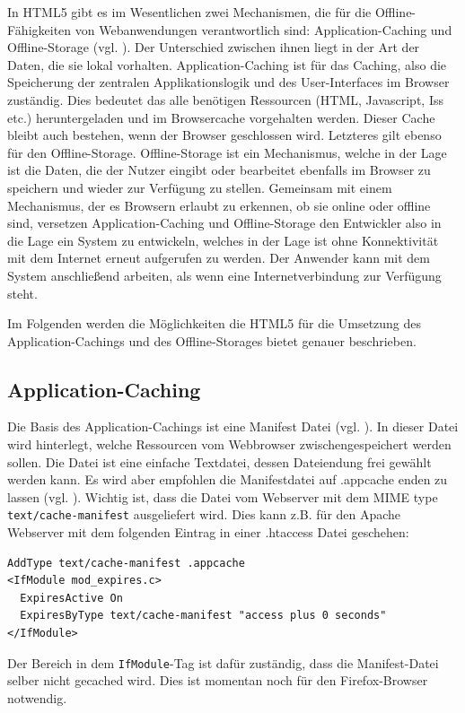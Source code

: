 In HTML5 gibt es im Wesentlichen zwei Mechanismen, die für die Offline-Fähigkeiten von Webanwendungen verantwortlich sind: Application-Caching und Offline-Storage (vgl. \cite{Mahemoff22010}). Der Unterschied zwischen ihnen liegt in der Art der Daten, die sie lokal vorhalten. Application-Caching ist für das Caching, also die Speicherung der zentralen Applikationslogik und des User-Interfaces im Browser zuständig. Dies bedeutet das alle benötigen Ressourcen (HTML, Javascript, Iss etc.) heruntergeladen und im Browsercache vorgehalten werden. Dieser Cache bleibt auch bestehen, wenn der Browser geschlossen wird. Letzteres gilt ebenso für den Offline-Storage. Offline-Storage ist ein Mechanismus, welche in der Lage ist die Daten, die der Nutzer eingibt oder bearbeitet ebenfalls im Browser zu speichern und wieder zur Verfügung zu stellen. Gemeinsam mit einem Mechanismus, der es Browsern erlaubt zu erkennen, ob sie online oder offline sind, versetzen Application-Caching und Offline-Storage den Entwickler also in die Lage ein System zu entwickeln, welches in der Lage ist ohne Konnektivität mit dem Internet erneut aufgerufen zu werden. Der Anwender kann mit dem System anschließend arbeiten, als wenn eine Internetverbindung zur Verfügung steht.

Im Folgenden werden die Möglichkeiten die HTML5 für die Umsetzung des Application-Cachings und des Offline-Storages bietet genauer beschrieben.

\subsection{Application-Caching}\label{section:appcache}
Die Basis des Application-Cachings ist eine Manifest Datei (vgl. \cite{Bidelman2010}). In dieser Datei wird hinterlegt, welche Ressourcen vom Webbrowser zwischengespeichert werden sollen. Die Datei ist eine einfache Textdatei, dessen Dateiendung frei gewählt werden kann. Es wird aber empfohlen die Manifestdatei auf .appcache enden zu lassen (vgl. \cite{W3C2012}). Wichtig ist, dass die Datei vom Webserver mit dem MIME type \texttt{text/cache-manifest} ausgeliefert wird. Dies kann z.B. für den  Apache Webserver mit dem folgenden Eintrag in einer .htaccess Datei geschehen:
\begin{lstlisting}
AddType text/cache-manifest .appcache
<IfModule mod_expires.c>
  ExpiresActive On
  ExpiresByType text/cache-manifest "access plus 0 seconds"
</IfModule>
\end{lstlisting}
Der Bereich in dem \texttt{IfModule}-Tag ist dafür zuständig, dass die Manifest-Datei selber nicht gecached wird. Dies ist momentan noch für den Firefox-Browser notwendig.

